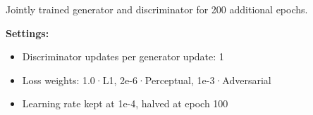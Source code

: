 Jointly trained generator and discriminator for 200 additional epochs.

\textbf{Settings:}

\begin{itemize}
    \item Discriminator updates per generator update: 1
    \item Loss weights: 1.0·L1, 2e-6·Perceptual, 1e-3·Adversarial
    \item Learning rate kept at 1e-4, halved at epoch 100
\end{itemize}



